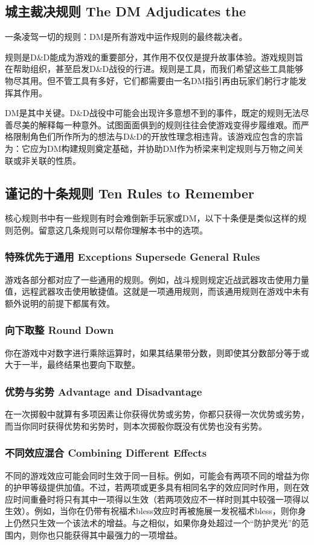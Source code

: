 \documentclass[letterpaper,10pt,twoside,twocolumn,openany]{dndbook}
\begin{document}
\subsection{城主裁决规则  The DM Adjudicates the}
\par{一条凌驾一切的规则：DM是所有游戏中运作规则的最终裁决者。}
\par{规则是D\&D能成为游戏的重要部分，其作用不仅仅是提升故事体验。游戏规则旨在帮助组织，甚至启发D\&D战役的行进。规则是工具，而我们希望这些工具能够物尽其用。但不管工具有多好，它们都需要由一名DM指引再由玩家们躬行才能发挥其作用。}
\par{DM是其中关键。D\&D战役中可能会出现许多意想不到的事件，既定的规则无法尽善尽美的解释每一种意外。试图面面俱到的规则往往会使游戏变得步履维艰。而严格限制角色们所作所为的想法与D\&D的开放性理念相违背。该游戏应包含的宗旨为：它应为DM构建规则奠定基础，并协助DM作为桥梁来判定规则与万物之间关联或非关联的性质。}
\subsection{谨记的十条规则 Ten Rules to Remember }
\par{核心规则书中有一些规则有时会难倒新手玩家或DM，以下十条便是类似这样的规则范例。留意这几条规则可以帮你理解本书中的选项。}
\subsubsection{特殊优先于通用 Exceptions Supersede General Rules }
\par{游戏各部分都对应了一些通用的规则。例如，战斗规则规定近战武器攻击使用力量值，远程武器攻击使用敏捷值。这就是一项通用规则，而该通用规则在游戏中未有额外说明的前提下都属有效。}
\subsubsection{向下取整 Round Down}
\par{你在游戏中对数字进行乘除运算时，如果其结果带分数，则即使其分数部分等于或大于一半，最终结果也要向下取整。}
\subsubsection{优势与劣势 Advantage and Disadvantage}
\par{在一次掷骰中就算有多项因素让你获得优势或劣势，你都只获得一次优势或劣势，而当你同时获得优势和劣势时，则本次掷骰你既没有优势也没有劣势。}
\subsubsection{不同效应混合 Combining Different Effects}
\par{不同的游戏效应可能会同时生效于同一目标。例如，可能会有两项不同的增益为你的护甲等级提供加值。不过，若两项或更多具有相同名字的效应同时作用，则在效应时间重叠时将只有其中一项得以生效（若两项效应不一样时则其中较强一项得以生效）。例如，当你在仍带有祝福术bless效应时再被施展一发祝福术bless，则你身上仍然只生效一个该法术的增益。与之相似，如果你身处超过一个“防护灵光”的范围内，则你也只能获得其中最强力的一项增益。}
\end{document}
